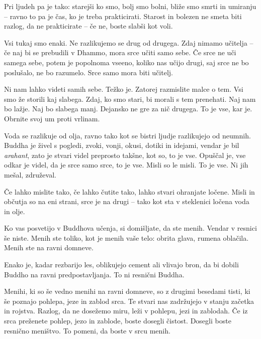 Pri ljudeh pa je tako: starejši ko smo, bolj smo bolni, bliže smo smrti in umiranju – ravno to pa je čas, ko je treba prakticirati. Starost in bolezen ne smeta biti razlog, da ne prakticirate – če ne, boste slabši kot voli.

\clearpage


Vsi tukaj smo enaki. Ne razlikujemo se drug od drugega. Zdaj nimamo učitelja – če naj bi se prebudili v Dhammo, mora srce učiti samo sebe. Če srce ne uči samega sebe, potem je popolnoma vseeno, koliko nas učijo drugi, saj srce ne bo poslušalo, ne bo razumelo. Srce samo mora biti učitelj.

Ni nam lahko videti samih sebe. Težko je. Zatorej razmislite malce o tem. Vsi smo že storili kaj slabega. Zdaj, ko smo stari, bi morali s tem prenehati. Naj nam bo lažje. Naj bo slabega manj. Dejansko ne gre za nič drugega. To je vse, kar je. Obrnite svoj um proti vrlinam.


Voda se razlikuje od olja, ravno tako kot se bistri ljudje razlikujejo od neumnih. Buddha je živel s pogledi, zvoki, vonji, okusi, dotiki in idejami, vendar je bil \emph{arahant}, zato je stvari videl preprosto takšne, kot so, to je vse. Opuščal je, vse odkar je videl, da je srce samo srce, to je vse. Misli so le misli. To je vse. Ni jih mešal, združeval.

Če lahko mislite tako, če lahko čutite tako, lahko stvari ohranjate ločene. Misli in občutja so na eni strani, srce je na drugi – tako kot sta v steklenici ločena voda in olje.

\clearpage


Ko vas posvetijo v Buddhova učenja, si domišljate, da ste menih. Vendar v resnici še niste. Menih ste toliko, kot je menih vaše telo: obrita glava, rumena oblačila. Menih ste na ravni domneve.

Enako je, kadar rezbarijo les, oblikujejo cement ali vlivajo bron, da bi dobili Buddho na ravni predpostavljanja. To ni resnični Buddha.

Menihi, ki so še vedno menihi na ravni domneve, so z drugimi besedami tisti, ki še poznajo pohlepa, jeze in zablod srca. Te stvari nas zadržujejo v stanju začetka in rojstva. Razlog, da ne dosežemo miru, leži v pohlepu, jezi in zablodah. Če iz srca preženete pohlep, jezo in zablode, boste dosegli čistost. Dosegli boste resnično meništvo. To pomeni, da boste v srcu menih.

